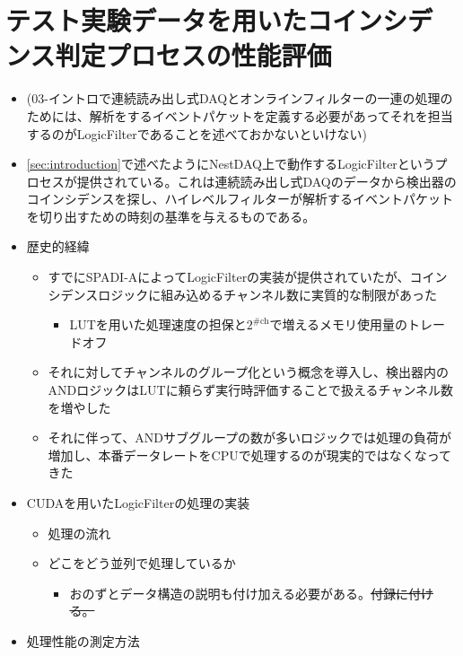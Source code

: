 \documentclass[../main.tex]{subfiles}
\begin{document}
\section{テスト実験データを用いたコインシデンス判定プロセスの性能評価}
\label{sec:LogicFilter}
\begin{tcolorbox}[
  title=執筆メモ,
  colback=yellow!8,
  colframe=black!30,
  breakable
]
\begin{itemize}
  \item (03-イントロで連続読み出し式DAQとオンラインフィルターの一連の処理のためには、解析をするイベントパケットを定義する必要があってそれを担当するのがLogicFilterであることを述べておかないといけない)
  \item \ref{sec:introduction}で述べたようにNestDAQ上で動作するLogicFilterというプロセスが提供されている。これは連続読み出し式DAQのデータから検出器のコインシデンスを探し、ハイレベルフィルターが解析するイベントパケットを切り出すための時刻の基準を与えるものである。
  \item 歴史的経緯
  \begin{itemize}
    \item すでにSPADI-AによってLogicFilterの実装が提供されていたが、コインシデンスロジックに組み込めるチャンネル数に実質的な制限があった
    \begin{itemize}
      \item LUTを用いた処理速度の担保と$2^{\text{\# ch}}$で増えるメモリ使用量のトレードオフ
    \end{itemize}
    \item それに対してチャンネルのグループ化という概念を導入し、検出器内のANDロジックはLUTに頼らず実行時評価することで扱えるチャンネル数を増やした
    \item それに伴って、ANDサブグループの数が多いロジックでは処理の負荷が増加し、本番データレートをCPUで処理するのが現実的ではなくなってきた
  \end{itemize}
  \item CUDAを用いたLogicFilterの処理の実装
  \begin{itemize}
    \item 処理の流れ
    \item どこをどう並列で処理しているか
    \begin{itemize}
      \item おのずとデータ構造の説明も付け加える必要がある。\sout{付録に付ける。}
    \end{itemize}
  \end{itemize}
  \item 処理性能の測定方法

\end{itemize}
\end{tcolorbox}
\end{document}
